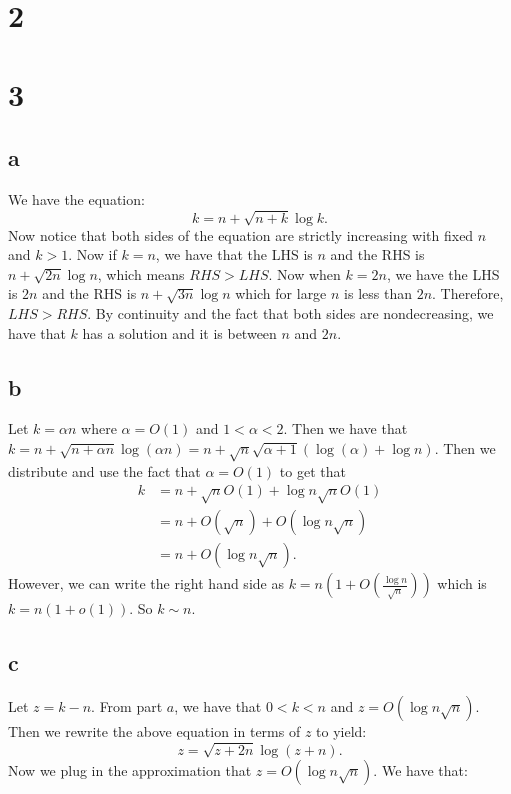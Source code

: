 \documentclass[]{article}
\begin{document}
\section{2}


\section{3}
\subsection{a}
We have the equation:
\begin{equation}
	k = n + \sqrt{n + k} \log k.
\end{equation}
Now notice that both sides of the equation are strictly increasing with fixed $n$ and $k > 1$. Now if $k = n$, we have that the LHS is $n$ and the RHS is $n + \sqrt{2n} \log n$, which means $RHS > LHS$. Now when $k = 2n$, we have the LHS is $2n$ and the RHS is $n + \sqrt{3n} \log n$ which for large $n$ is less than $2n$. Therefore, $LHS > RHS$. By continuity and the fact that both sides are nondecreasing, we have that $k$ has a solution and it is between $n$ and $2n$. 
\subsection{b}
Let $k = \alpha n$ where $\alpha = O(1)$ and $1 < \alpha < 2$. 
Then we have that 
$k = n + \sqrt{n + \alpha n} \log (\alpha n) = n + \sqrt{n} \sqrt{\alpha + 1} (\log(\alpha) + \log n)$. Then we distribute and use the fact that $\alpha = O(1)$ to get that
\begin{align*}
	k &= n + \sqrt{n} O(1) + \log n \sqrt{n} O(1)\\
	 &= n + O(\sqrt{n}) + O(\log n \sqrt{n})\\
	 &= n + O(\log n \sqrt n).
\end{align*}
However, we can write the right hand side as $k = n(1 + O(\frac{\log n}{\sqrt{n}}))$ which is $k = n(1 + o(1))$. So $k \sim n$. 
\subsection{c}
Let $z = k - n$. From part $a$, we have that $0 < k < n$ and $z =  O(\log n \sqrt n)$. Then we rewrite the above equation in terms of $z$ to yield:
\begin{equation}
	z = \sqrt{z + 2n} \log (z + n).
\end{equation}
Now we plug in the approximation that $z = O(\log n \sqrt{n})$. We have that:
\end{document}
